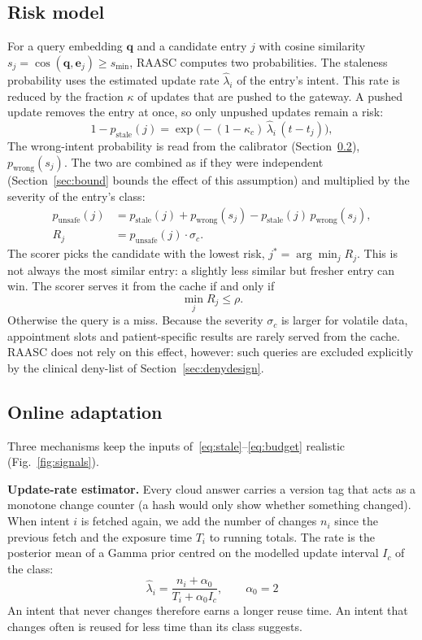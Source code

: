 \documentclass[journal]{IEEEtran}
\newcommand{\hatlam}{\hat{\lambda}}
\begin{document}
\subsection{Risk model}\label{sec:risk}
For a query embedding $\mathbf{q}$ and a candidate entry $j$ with cosine similarity $s_j=\cos(\mathbf{q},\mathbf{e}_j)\ge s_{\min}$, RAASC computes two probabilities. The staleness probability uses the estimated update rate $\hatlam_i$ of the entry's intent. This rate is reduced by the fraction $\kappa$ of updates that are pushed to the gateway. A pushed update removes the entry at once, so only unpushed updates remain a risk:
\begin{equation}
1-p_{\text{stale}}(j)=\exp\!\big(-(1-\kappa_c)\,\hatlam_i\,(t-t_j)\big),\label{eq:stale}
\end{equation}
The wrong-intent probability is read from the calibrator (Section~\ref{sec:calibrator}), $p_{\text{wrong}}(s_j)$. The two are combined as if they were independent (Section~\ref{sec:bound} bounds the effect of this assumption) and multiplied by the severity of the entry's class:
\begin{align}
p_{\text{unsafe}}(j)&=p_{\text{stale}}(j)+p_{\text{wrong}}(s_j)-p_{\text{stale}}(j)\,p_{\text{wrong}}(s_j),\nonumber\\
R_j&=p_{\text{unsafe}}(j)\cdot\sigma_c.\label{eq:unsafe}
\end{align}
The scorer picks the candidate with the lowest risk, $j^{*}=\arg\min_j R_j$. This is not always the most similar entry: a slightly less similar but fresher entry can win. The scorer serves it from the cache if and only if
\begin{equation}
\min_j R_j\le\rho.\label{eq:budget}
\end{equation}
Otherwise the query is a miss. Because the severity $\sigma_c$ is larger for volatile data, appointment slots and patient-specific results are rarely served from the cache. RAASC does not rely on this effect, however: such queries are excluded explicitly by the clinical deny-list of Section~\ref{sec:denydesign}.

\subsection{Online adaptation}\label{sec:calibrator}
Three mechanisms keep the inputs of~\eqref{eq:stale}--\eqref{eq:budget} realistic (Fig.~\ref{fig:signals}).

\textbf{Update-rate estimator.} Every cloud answer carries a version tag that acts as a monotone change counter (a hash would only show whether something changed). When intent $i$ is fetched again, we add the number of changes $n_i$ since the previous fetch and the exposure time $T_i$ to running totals. The rate is the posterior mean of a Gamma prior centred on the modelled update interval $I_c$ of the class:
\begin{equation}
\hatlam_i=\frac{n_i+\alpha_0}{T_i+\alpha_0 I_c},\qquad \alpha_0=2\label{eq:rate}
\end{equation}
An intent that never changes therefore earns a longer reuse time. An intent that changes often is reused for less time than its class suggests.
\end{document}
